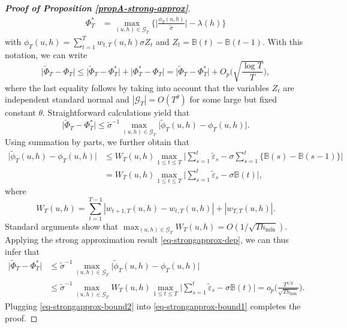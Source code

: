 \documentclass[a4paper,12pt]{article}
\numberwithin{equation}{section}
\begin{document}
\begin{proof}[\textnormal{\textbf{Proof of Proposition \ref{propA-strong-approx}}}]
\begin{align*}
\Phi_T^{*} & = \max_{(u,h) \in \mathcal{G}_T} \Big\{ \Big|\frac{\phi_T(u,h)}{\widetilde{\sigma}}\Big| - \lambda(h) \Big\} 
\end{align*}
with $\phi_T(u,h) = \sum\nolimits_{t=1}^T w_{t,T}(u,h) \sigma Z_t$ and $Z_t = \mathbb{B}(t) - \mathbb{B}(t-1)$. With this notation, we can write 
\begin{equation}\label{eq-strongapprox-bound1}
\big| \widetilde{\Phi}_T - \Phi_T \big| \le \big| \widetilde{\Phi}_T - \Phi_T^{*} \big| + \big| \Phi_T^{*} - \Phi_T \big| = \big| \widetilde{\Phi}_T - \Phi_T^{*} \big| + O_p \Big( \sqrt{\frac{\log T}{T}} \Big), 
\end{equation}
where the last equality follows by taking into account that the variables $Z_t$ are independent standard normal and $|\mathcal{G}_T| = O(T^\theta)$ for some large but fixed constant $\theta$. Straightforward calculations yield that 
\[ \big| \widetilde{\Phi}_T - \Phi_T^{*} \big| \le \widetilde{\sigma}^{-1} \max_{(u,h) \in \mathcal{G}_T} \big| \widetilde{\phi}_T(u,h) - \phi_T(u,h) \big|. \]
Using summation by parts,
we further obtain that 
\begin{align*}
\big| \widetilde{\phi}_T(u,h) - \phi_T(u,h) \big| 
 & \le W_T(u,h) \max_{1 \le t \le T} \Big| \sum\limits_{s=1}^t \widetilde{\varepsilon}_s - \sigma \sum\limits_{s=1}^t \big\{ \mathbb{B}(s) - \mathbb{B}(s-1) \big\} \Big| \\
 & = W_T(u,h) \max_{1 \le t \le T} \Big| \sum\limits_{s=1}^t \widetilde{\varepsilon}_s - \sigma \mathbb{B}(t) \Big|,
\end{align*}
where
\[ W_T(u,h) = \sum\limits_{t=1}^{T-1} |w_{t+1,T}(u,h) - w_{t,T}(u,h)| + |w_{T,T}(u,h)|. \]
Standard arguments show that $\max_{(u,h) \in \mathcal{G}_T} W_T(u,h) = O( 1/\sqrt{Th_{\min}} )$. Applying the strong approximation result \eqref{eq-strongapprox-dep}, we can thus infer that 
\begin{align}
\big| \widetilde{\Phi}_T - \Phi_T^{*} \big| 
 & \le \widetilde{\sigma}^{-1} \max_{(u,h) \in \mathcal{G}_T} \big| \widetilde{\phi}_T(u,h) - \phi_T(u,h) \big| \nonumber \\
 & \le \widetilde{\sigma}^{-1} \max_{(u,h) \in \mathcal{G}_T} W_T(u,h) \max_{1 \le t \le T} \Big| \sum\limits_{s=1}^t \widetilde{\varepsilon}_s - \sigma \mathbb{B}(t) \Big| 
 = o_p \Big( \frac{T^{1/q}}{\sqrt{Th_{\min}}} \Big). \label{eq-strongapprox-bound2}
\end{align}
Plugging \eqref{eq-strongapprox-bound2} into \eqref{eq-strongapprox-bound1} completes the proof.
\end{proof}
\end{document}
